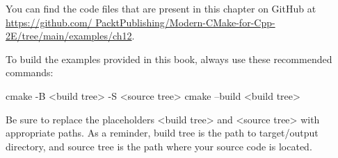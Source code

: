 You can find the code files that are present in this chapter on GitHub at \url{https://github.com/ PacktPublishing/Modern-CMake-for-Cpp-2E/tree/main/examples/ch12}.

To build the examples provided in this book, always use these recommended commands:

\begin{shell}
cmake -B <build tree> -S <source tree>
cmake --build <build tree>
\end{shell}

Be sure to replace the placeholders <build tree> and <source tree> with appropriate paths. As a reminder, build tree is the path to target/output directory, and source tree is the path where your source code is located.

